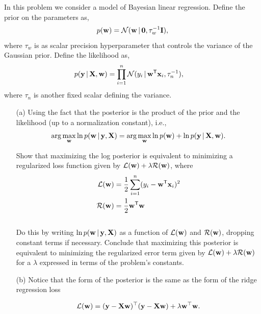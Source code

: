 \documentclass[submit]{harvardml}
\begin{document}
\begin{problem}
In this problem we consider a model of Bayesian linear regression. Define the prior on the parameters as,
\begin{align*}
p(\mathbf{w}) = \mathcal{N}(\mathbf{w} \,|\, \bold0, \tau_w^{-1}\mathbf{I} ),
\end{align*}
where $\tau_w$ is as scalar precision hyperparameter that controls the variance of the Gaussian prior.  Define the likelihood as,
\begin{align*}
p(\mathbf{y} \,|\, \mathbf{X}, \mathbf{w}) &= \prod_{i=1}^n \mathcal{N}(y_i \,|\, \mathbf{w}^{\mathsf{T}} \mathbf{x}_i, \tau_n^{-1}),
\end{align*}
where $\tau_n$ is another fixed scalar defining the variance. \\

\begin{itemize}
\item[(a)] Using the fact that the posterior is the product of the prior and the likelihood (up to a normalization constant), i.e.,
\[\arg\max_{\mathbf{w}} \ln p(\mathbf{w} \,|\, \mathbf{y}, \mathbf{X})= \arg\max_{\mathbf{w}} \ln p(\mathbf{w}) + \ln p(\mathbf{y} \,|\, \mathbf{X}, \mathbf{w}).\]

\noindent Show that maximizing the log posterior is equivalent to minimizing a regularized loss function given by ${\mathcal{L}(\mathbf{w}) + \lambda \mathcal{R}(\mathbf{w})}$, where
\begin{align*}
\mathcal{L}(\mathbf{w}) &= \frac{1}{2}\sum_{i = 1}^n (y_i - \mathbf{w}^{\mathsf{T}} \mathbf{x}_i)^2 \\
\mathcal{R}(\mathbf{w}) &= \frac{1}{2}\mathbf{w}^{\mathsf{T}} \mathbf{w}
\end{align*} \\

Do this by writing $\ln p(\mathbf{w} \,|\, \mathbf{y}, \mathbf{X})$ as a function of $\mathcal{L}(\mathbf{w})$ and $\mathcal{R}(\mathbf{w})$, dropping constant terms if necessary.  Conclude that maximizing this posterior is equivalent to minimizing the regularized error term given by $\mathcal{L}(\mathbf{w}) + \lambda \mathcal{R}(\mathbf{w})$ for a $\lambda$ expressed in terms of the problem's constants.

\item[(b)] Notice that the form of the posterior is the same as the
  form of the ridge regression loss

\[\mathcal{L}(\mathbf{w}) = (\mathbf{y} - \mathbf{X} \mathbf{w})^\top (\mathbf{y} - \mathbf{X}
\mathbf{w}) + \lambda \mathbf{w}^\top \mathbf{w} .\]


\end{itemize}
\end{problem}
\end{document}
